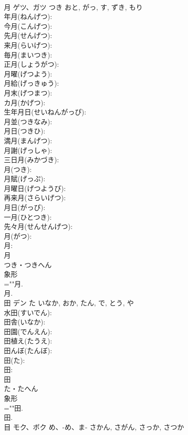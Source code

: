 \documentclass[8pt]{extreport}
\begin{document}
\begin{CJK}{UTF8}{min}
\\	月	ゲツ、ガツ	つき	おと, がっ, す, ずき, もり	
\\	年月(ねんげつ): 
\\	今月(こんげつ): 
\\	先月(せんげつ): 
\\	来月(らいげつ): 
\\	毎月(まいつき): 
\\	正月(しょうがつ): 
\\	月曜(げつよう): 
\\	月給(げっきゅう): 
\\	月末(げつまつ): 
\\	カ月(かげつ): 
\\	生年月日(せいねんがっぴ): 
\\	月並(つきなみ): 
\\	月日(つきひ): 
\\	満月(まんげつ): 
\\	月謝(げっしゃ): 
\\	三日月(みかづき): 
\\	月(つき): 
\\	月賦(げっぷ): 
\\	月曜日(げつようび): 
\\	再来月(さらいげつ): 
\\	月日(がっぴ): 
\\	一月(ひとつき): 
\\	先々月(せんせんげつ): 
\\	月(がつ): 
\\	月: 
\\	月	
\\	つき・つきへん	
\\	象形 
\\	=""月.
\\	月.
\\	田	デン	た	いなか, おか, たん, で, とう, や	
\\	水田(すいでん): 
\\	田舎(いなか): 
\\	田園(でんえん): 
\\	田植え(たうえ): 
\\	田んぼ(たんぼ): 
\\	田(た): 
\\	田: 
\\	田	
\\	た・たへん	
\\	象形 
\\	=""田.
\\	田.
\\	目	モク、ボク	め、-め、ま-	さかん, さがん, さっか, さつか	

\end{CJK}
\end{document}
